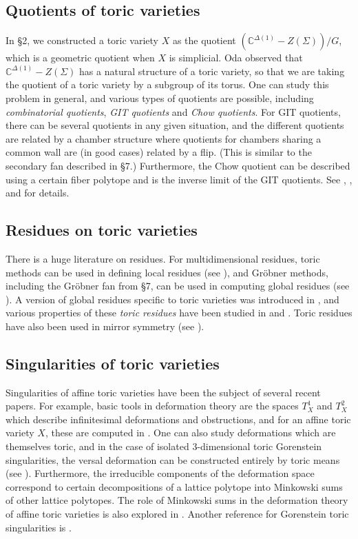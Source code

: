 \documentclass{amsart}
\theoremstyle{plain}
\theoremstyle{definition}
\begin{document}
	\subsection{Quotients of toric varieties} In \S2, we
constructed a toric variety $X$ as the quotient $(\mathbb{C}^{\Delta(1)}
- Z(\Sigma))/G$, which is a geometric quotient when $X$ is simplicial.
Oda observed that $\mathbb{C}^{\Delta(1)} - Z(\Sigma)$ has a natural
structure of a toric variety, so that we are taking the quotient of a
toric variety by a subgroup of its torus.  One can study this problem
in general, and various types of quotients are possible, including
{\it combinatorial quotients\/}, {\it GIT quotients\/} and {\it Chow
quotients\/}.  For GIT quotients, there can be several quotients in
any given situation, and the different quotients are related by a
chamber structure where quotients for chambers sharing a common wall
are (in good cases) related by a flip.  (This is similar to the
secondary fan described in \S7.)  Furthermore, the Chow quotient can
be described using a certain fiber polytope and is the inverse limit
of the GIT quotients.  See \cite{B-BS}, \cite{Hu},
\cite{KSZ2} and \cite{Tha} for details.

	\subsection{Residues on toric varieties} There is a
huge literature on residues.  For multidimensional residues, toric
methods can be used in defining local residues (see \cite{PT}), and
Gr\"obner methods, including the Gr\"obner fan from \S7, can be used
in computing global residues (see \cite{CDS}).  A version of global
residues specific to toric varieties was introduced in \cite{Cox3},
and various properties of these {\it toric residues\/} have been
studied in \cite{CCD} and \cite{CD}.  Toric residues have also been
used in mirror symmetry (see \cite{MP}).

	\subsection{Singularities of toric varieties}
Singularities of affine toric varieties have been the subject of
several recent papers.  For example, basic tools in deformation theory
are the spaces $T^1_X$ and $T^2_X$ which describe infinitesimal
deformations and obstructions, and for an affine toric variety $X$,
these are computed in \cite{Alt1}.  One can also study deformations
which are themselves toric, and in the case of isolated
$3$-dimensional toric Gorenstein singularities, the versal deformation
can be constructed entirely by toric means (see \cite{Alt3}).
Furthermore, the irreducible components of the deformation space
correspond to certain decompositions of a lattice polytope into
Minkowski sums of other lattice polytopes.  The role of Minkowski sums
in the deformation theory of affine toric varieties is also explored
in \cite{Alt2}.  Another reference for Gorenstein toric singularities
is \cite{Nom}.
\end{document}
